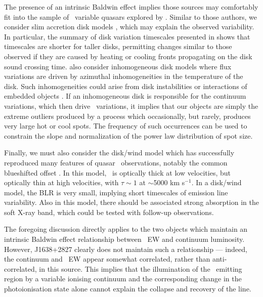 \documentclass[fleqn,usenatbib]{mnras}
\begin{document}
The presence of an intrinsic Baldwin effect implies those sources may
comfortably fit into the sample of \civ\ variable quasars explored by
\citet{Dyer2019}. Similar to those authors, we consider slim accretion
disk models \citep[e.g.,][]{Abramowicz1988}, which may explain the
observed variability. In particular, the summary of disk variation
timescales presented in \citet{Stern2018} shows that timescales are
shorter for taller disks, permitting changes similar to those observed
if they are caused by heating or cooling fronts propagating on the
disk sound crossing time. \citet{Dyer2019} also consider inhomogeneous
disk models \citep[e.g.,][]{DexterAgol2011} where flux variations are
driven by azimuthal inhomogeneities in the temperature of the
disk. Such inhomogeneities could arise from disk instabilities
\citep[e.g.,][]{LightmanEardley1974} or interactions of embedded
objects \citep[e.g.,][]{McKernan2014, McKernan2018}. If an
inhomogeneous disk is responsible for the continuum variations, which
then drive \civ\ variations, it implies that our objects are simply
the extreme outliers produced by a process which occasionally, but
rarely, produces very large hot or cool spots. The frequency of such
occurrences can be used to constrain the slope and normalization of
the power law distribution of spot size.

Finally, we must also consider the disk/wind model which has
successfully reproduced many features of quasar \civ\ observations,
notably the common blueshifted offset \citep[e.g.,][]{Murray1995}. In
this model, \civ\ is optically thick at low velocities, but optically
thin at high velocities, with $\tau \sim 1$ at $\sim$5000 km
s$^{-1}$. In a disk/wind model, the BLR is very small, implying short
timescales of emission line variability. Also in this model, there
should be associated strong absorption in the soft X-ray band, which
could be tested with follow-up observations.

The foregoing discussion directly applies to the two objects which
maintain an intrinsic Baldwin effect relationship between \civ\ EW and
continuum luminosity. However, J1638+2827 clearly does not maintain
such a relationship --- indeed, the continuum and \civ\ EW appear
somewhat correlated, rather than anti-correlated, in this source. This
implies that the illumination of the \civ\ emitting region by a
variable ionising continuum and the corresponding change in the
photoionisation state alone cannot explain the collapse and recovery
of the line.
\end{document}
